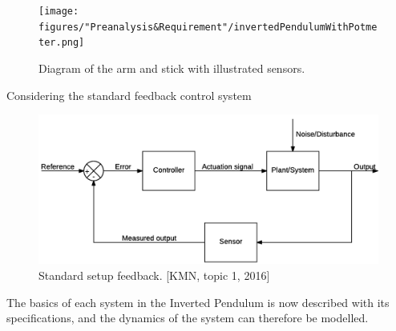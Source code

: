 \begin{figure} [htbp]
	\centering
	\texttt{[image: figures/"Preanalysis\&Requirement"/invertedPendulumWithPotmeter.png]}
	\caption{Diagram of the arm and stick with illustrated sensors.} \label{fig:InvertedPendulumSetUpPotmeter}
\end{figure}

Considering the standard feedback control system 

\begin{figure}[htbp]
	\centering
	\includegraphics[width=1\linewidth]{figures/modeling/MechanicalSystem.PNG}
	\caption{Standard setup feedback. [KMN, topic 1, 2016]} \label{fig:BasicFeedbackSystem}
\end{figure}



The basics of each system in the Inverted Pendulum is now described with its specifications, and the dynamics of the system can therefore be modelled.


\newpage
